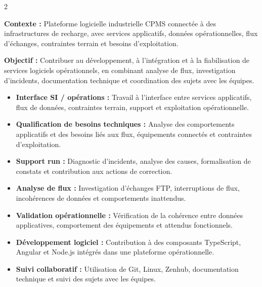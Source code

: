 \documentclass[8pt,a4paper,ragged2e,withhyper]{altacv}
\begin{document}



\makecvheader
\vspace{-0.3cm}


\begin{paracol}{2}



\textbf{Contexte :} Plateforme logicielle industrielle CPMS connectée à des infrastructures de recharge, avec services applicatifs, données opérationnelles, flux d’échanges, contraintes terrain et besoins d’exploitation.

\textbf{Objectif :} Contribuer au développement, à l’intégration et à la fiabilisation de services logiciels opérationnels, en combinant analyse de flux, investigation d’incidents, documentation technique et coordination des sujets avec les équipes.

\begin{itemize}
  \item \textbf{Interface SI / opérations :} Travail à l’interface entre services applicatifs, flux de données, contraintes terrain, support et exploitation opérationnelle.
  \item \textbf{Qualification de besoins techniques :} Analyse des comportements applicatifs et des besoins liés aux flux, équipements connectés et contraintes d’exploitation.
  \item \textbf{Support run :} Diagnostic d’incidents, analyse des causes, formalisation de constats et contribution aux actions de correction.
  \item \textbf{Analyse de flux :} Investigation d’échanges FTP, interruptions de flux, incohérences de données et comportements inattendus.
  \item \textbf{Validation opérationnelle :} Vérification de la cohérence entre données applicatives, comportement des équipements et attendus fonctionnels.
  \item \textbf{Développement logiciel :} Contribution à des composants TypeScript, Angular et Node.js intégrés dans une plateforme opérationnelle.
  \item \textbf{Suivi collaboratif :} Utilisation de Git, Linux, Zenhub, documentation technique et suivi des sujets avec les équipes.
\end{itemize}


\end{paracol}
\end{document}
